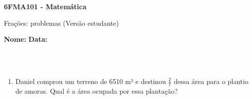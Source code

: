 \documentclass[a4paper,14pt]{article}
\begin{document}
	
	\noindent\textbf{6FMA101 - Matemática} 
	
	\begin{center}Frações: problemas (Versão estudante)
	\end{center}
	
	\noindent\textbf{Nome:} \underline{\hspace{10cm}}
	\noindent\textbf{Data:} \underline{\hspace{4cm}}
	
	~ \\ ~
	\begin{multicols}{2}
    	\begin{enumerate}
    		\item Daniel comprou um terreno de 6510 m² e destinou $\frac{2}{7}$ dessa área para o plantio de amoras. Qual é a área ocupada por essa plantação? \\\\\\\\\\\\\\\\\\\\\\\\\\\\\\\\\\\\\\\\\\\\\\\\\\\\\\

\end{enumerate}
\end{multicols}
\end{document}
